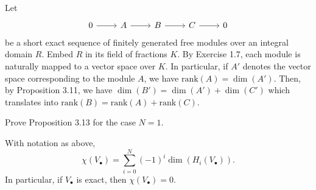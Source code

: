 \documentclass[../../master.tex]{subfiles}
\begin{document}
\begin{solution}
    Let
	\[
	\begin{tikzcd}
	    0 & A & B & C & 0
	    \arrow[from=1-1, to=1-2]
	    \arrow[from=1-2, to=1-3]
	    \arrow[from=1-3, to=1-4]
	    \arrow[from=1-4, to=1-5]
	\end{tikzcd}
	\]
        be a short exact sequence of finitely generated free modules over an integral domain $R$.
        Embed $R$ in its field of fractions $K$.
        By Exercise 1.7, each module is naturally mapped to a vector space over $K$.
        In particular, if $A'$ denotes the vector space corresponding to the module $A$, we have $\text{rank}(A) = \dim(A')$.
        Then, by Proposition 3.11, we have $\dim(B') = \dim(A') + \dim(C')$ which translates into $\text{rank}(B) = \text{rank}(A) + \text{rank}(C)$.
\end{solution}

\begin{problem}
    Prove Proposition 3.13 for the case $N = 1$.
    \begin{proposition}[Proposition 3.13] 
        With notation as above,
        \[
            \chi(V_{\bullet}) = \sum_{i=0}^{N} (-1)^{i} \dim(H_i(V_{\bullet})).
        \]
        In particular, if $V_{\bullet}$ is exact, then $\chi(V_{\bullet}) = 0$.
    \end{proposition}
\end{problem}
\end{document}
